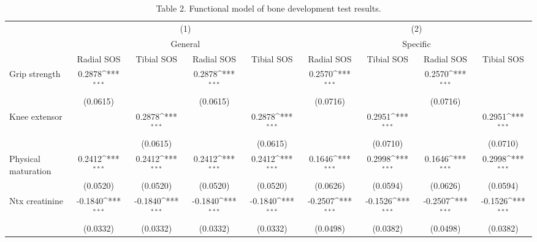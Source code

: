 \begin{table}[htbp]\centering
\def\sym#1{\ifmmode^{#1}\else\(^{#1}\)\fi}
\caption{Table 2. Functional model of bone development test results.}
\begin{tabular}{l*{8}{c}}
\hline\hline
                         &\multicolumn{4}{c}{(1)}                                                        &\multicolumn{4}{c}{(2)}                                                        \\
                         &\multicolumn{4}{c}{General}                                                    &\multicolumn{4}{c}{Specific}                                                   \\
                         &Radial SOS         &Tibial SOS         &Radial SOS         &Tibial SOS         &Radial SOS         &Tibial SOS         &Radial SOS         &Tibial SOS         \\
\hline
Grip strength            &    0.2878\sym{***}&                   &    0.2878\sym{***}&                   &    0.2570\sym{***}&                   &    0.2570\sym{***}&                   \\
                         &  (0.0615)         &                   &  (0.0615)         &                   &  (0.0716)         &                   &  (0.0716)         &                   \\
[1em]
Knee extensor            &                   &    0.2878\sym{***}&                   &    0.2878\sym{***}&                   &    0.2951\sym{***}&                   &    0.2951\sym{***}\\
                         &                   &  (0.0615)         &                   &  (0.0615)         &                   &  (0.0710)         &                   &  (0.0710)         \\
[1em]
Physical maturation      &    0.2412\sym{***}&    0.2412\sym{***}&    0.2412\sym{***}&    0.2412\sym{***}&    0.1646\sym{***}&    0.2998\sym{***}&    0.1646\sym{***}&    0.2998\sym{***}\\
                         &  (0.0520)         &  (0.0520)         &  (0.0520)         &  (0.0520)         &  (0.0626)         &  (0.0594)         &  (0.0626)         &  (0.0594)         \\
[1em]
Ntx creatinine           &   -0.1840\sym{***}&   -0.1840\sym{***}&   -0.1840\sym{***}&   -0.1840\sym{***}&   -0.2507\sym{***}&   -0.1526\sym{***}&   -0.2507\sym{***}&   -0.1526\sym{***}\\
                         &  (0.0332)         &  (0.0332)         &  (0.0332)         &  (0.0332)         &  (0.0498)         &  (0.0382)         &  (0.0498)         &  (0.0382)         \\

\end{tabular}
\end{table}
